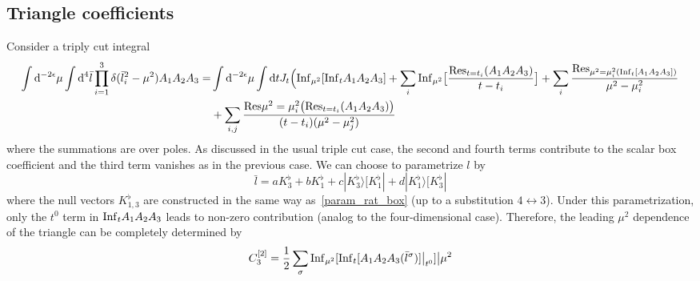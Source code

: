 \subsection{Triangle coefficients}
Consider a triply cut integral
\begin{equation*}
\begin{split}
\int \textrm{d}^{-2\epsilon}\mu \int \textrm{d}^4\bar{l}\prod_{i=1}^3\delta(\bar{l}_i^2 - \mu^2)A_1A_2A_3
= &
\int \textrm{d}^{-2\epsilon}\mu\int \textrm{d} t J_t \Big(
\mathrm{Inf}_{\mu^2}[\mathrm{Inf}_tA_1A_2A_3] 
+ \sum_i\mathrm{Inf}_{\mu^2}\big[\frac{\mathrm{Res}_{t=t_i}(A_1A_2A_3)}{t-t_i}\big]
+ \sum_i\frac{\mathrm{Res}_{\mu^2 = \mu_i^2(\mathrm{Inf}_t[A_1A_2A_3])}}{\mu^2 -\mu_i^2}
\\ &
+\sum_{i,j}\frac{\mathrm{Res}{\mu^2 = \mu_i^2}\big(\mathrm{Res}_{t=t_i}(A_1A_2A_3)\big)}{(t-t_i)(\mu^2 - \mu_j^2)}
\end{split}
\end{equation*}
where the summations are over poles.
As discussed in the usual triple cut case, the second and fourth terms contribute to the scalar box coefficient and the third term vanishes as in the previous case.
We can choose to parametrize $l$ by
\begin{equation*}
\bar{l} = a K_3^\flat + bK_1^\flat + c|K_3^\flat\rangle [K_1^\flat| + d|K_1^\flat\rangle[K_3^\flat|
\end{equation*}
where the null vectors $K_{1,3}^\flat$ are constructed in the same way as~\cref{param_rat_box} (up to a substitution $4\leftrightarrow 3$).
Under this parametrization, only the $t^0$ term in $\mathrm{Inf}_tA_1A_2A_3$ leads to non-zero contribution (analog to the four-dimensional case).
Therefore, the leading $\mu^2$ dependence of the triangle can be completely determined by 
\begin{equation*}
C_3^{[2]} = \frac{1}{2}\sum_\sigma\mathrm{Inf}_{\mu^2}[\mathrm{Inf}_t[A_1A_2A_3(\bar{l}^\sigma)]\big|_{t^0}]\big|{\mu^2}
\end{equation*}
%
%
